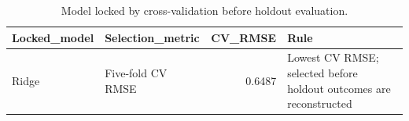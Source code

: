 \begin{table}

\caption{\label{tab:p4-model-lock}Model locked by cross-validation before holdout evaluation.}
\centering
\begin{tabular}[t]{llrl}
\toprule
Locked\_model & Selection\_metric & CV\_RMSE & Rule\\
\midrule
Ridge & Five-fold CV RMSE & 0.6487 & Lowest CV RMSE; selected before holdout outcomes are reconstructed\\
\bottomrule
\end{tabular}
\end{table}
